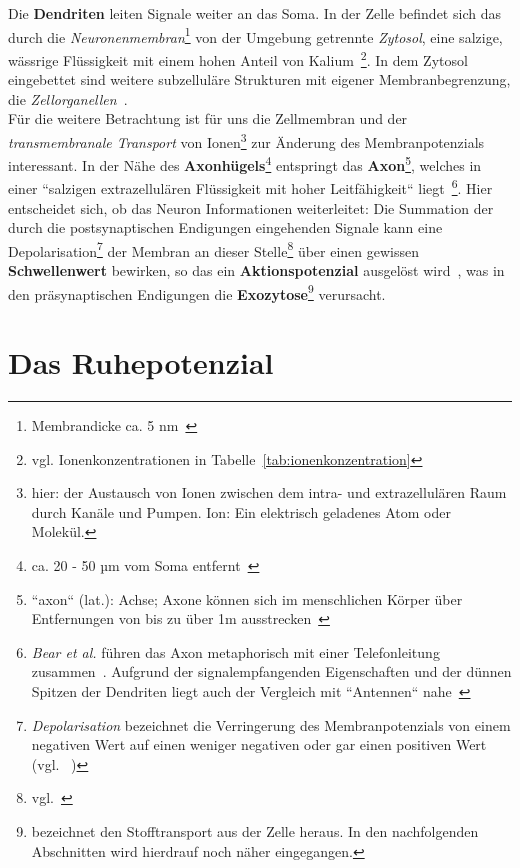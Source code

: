 Die \textbf{Dendriten} leiten Signale weiter an das Soma.
In der Zelle befindet sich das durch die \textit{Neuronenmembran}\footnote{
 Membrandicke ca. 5 nm~\cite[66]{FE19}
} von der Umgebung getrennte \textit{Zytosol}, eine salzige, wässrige Flüssigkeit mit einem hohen Anteil von Kalium~\cite[29]{BCP18}\footnote{
 vgl. Ionenkonzentrationen in Tabelle~\ref{tab:ionenkonzentration}
}.
In dem Zytosol eingebettet sind weitere subzelluläre Strukturen mit eigener Membranbegrenzung, die \textit{Zellorganellen}~\cite[8]{SD07}.\\

Für die weitere Betrachtung ist für uns die Zellmembran und der \textit{transmembranale Transport} von Ionen\footnote{
 hier: der Austausch von Ionen zwischen dem intra- und extrazellulären Raum durch Kanäle und Pumpen. Ion: Ein elektrisch geladenes Atom oder Molekül.
} zur Änderung des Membranpotenzials interessant. In der Nähe des \textbf{Axonhügels}\footnote{
 ca. 20 - 50 µm vom Soma entfernt~\cite[77]{Jon19}
} entspringt das \textbf{Axon}\footnote{
 ``axon`` (lat.): Achse; Axone können sich im menschlichen Körper über Entfernungen von bis zu über 1m ausstrecken~\cite[28]{BCP18}
}, welches in einer ``salzigen extrazellulären Flüssigkeit mit hoher Leitfähigkeit`` liegt~\cite[61]{BCP18}\footnote{
  \textit{Bear et al.} führen das Axon metaphorisch mit einer Telefonleitung zusammen~\cite[43]{BCP18}. Aufgrund der signalempfangenden Eigenschaften und der dünnen Spitzen der Dendriten liegt auch der Vergleich mit ``Antennen`` nahe~\cite[28]{BCP18}
}.
Hier entscheidet sich, ob das Neuron Informationen weiterleitet: Die Summation der durch die postsynaptischen Endigungen eingehenden Signale kann eine Depolarisation\footnote{
  \textit{Depolarisation} bezeichnet die Verringerung des Membranpotenzials von einem negativen Wert auf einen weniger negativen oder gar einen positiven Wert (vgl. ~\cite[95 f.]{SBB+13})
} der Membran an dieser Stelle\footnote{vgl.~\cite[61]{Eil19}} über einen gewissen \textbf{Schwellenwert} bewirken, so das ein \textbf{Aktionspotenzial} ausgelöst wird~\cite[142 f.]{BCP18}, was in den präsynaptischen Endigungen die \textbf{Exozytose}\footnote{
  bezeichnet den Stofftransport aus der Zelle heraus. In den nachfolgenden Abschnitten wird hierdrauf noch näher eingegangen.
} verursacht.


\section{Das Ruhepotenzial}

